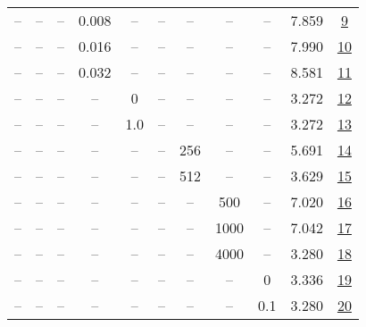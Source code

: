 \begin{table}[H]
\begin{tabular}{ccccccccccc}
-- & -- & -- & 0.008 & -- & -- & -- & -- & -- & 7.859 & \href{https://wandb.ai/stanford-mercury/optimizer-scaling/runs/sweep-300m-6B-minim70e785lr0.008-wd0.2-minlr0-warmup2000-b10.9-b-8588ff}{9} \\
-- & -- & -- & 0.016 & -- & -- & -- & -- & -- & 7.990 & \href{https://wandb.ai/stanford-mercury/optimizer-scaling/runs/sweep-300m-6B-mini7b7df9lr0.016-wd0.2-minlr0-warmup2000-b10.9-b2-7d82fa}{10} \\
-- & -- & -- & 0.032 & -- & -- & -- & -- & -- & 8.581 & \href{https://wandb.ai/stanford-mercury/optimizer-scaling/runs/sweep-300m-6B-mini1247b4lr0.032-wd0.2-minlr0-warmup2000-b10.9-b2-b5154c}{11} \\
-- & -- & -- & -- & 0 & -- & -- & -- & -- & 3.272 & \href{https://wandb.ai/stanford-mercury/optimizer-scaling/runs/sweep-300m-6B-minimf375ddlr0.004-wd0.2-minlr0-warmup2000-b10.9-b-eeb31b}{12} \\
-- & -- & -- & -- & 1.0 & -- & -- & -- & -- & 3.272 & \href{https://wandb.ai/stanford-mercury/optimizer-scaling/runs/sweep-300m-6B-mini0658b0lr0.004-wd0.2-minlr0-warmup2000-b10.9-b2-47b3ae}{13} \\
-- & -- & -- & -- & -- & -- & 256 & -- & -- & 5.691 & \href{https://wandb.ai/stanford-mercury/optimizer-scaling/runs/sweep-300m-6B-minim043b8elr0.004-wd0.2-minlr0-warmup2000-b10.9-b-687e85}{14} \\
-- & -- & -- & -- & -- & -- & 512 & -- & -- & 3.629 & \href{https://wandb.ai/stanford-mercury/optimizer-scaling/runs/sweep-300m-6B-minim140e6dlr0.004-wd0.2-minlr0-warmup2000-b10.9-b-2bda97}{15} \\
-- & -- & -- & -- & -- & -- & -- & 500 & -- & 7.020 & \href{https://wandb.ai/stanford-mercury/optimizer-scaling/runs/sweep-300m-6B-minim159817lr0.004-wd0.2-minlr0-warmup500-b10.9-b2-8ca381}{16} \\
-- & -- & -- & -- & -- & -- & -- & 1000 & -- & 7.042 & \href{https://wandb.ai/stanford-mercury/optimizer-scaling/runs/sweep-300m-6B-mini1778f2lr0.004-wd0.2-minlr0-warmup1000-b10.9-b2-55a012}{17} \\
-- & -- & -- & -- & -- & -- & -- & 4000 & -- & 3.280 & \href{https://wandb.ai/stanford-mercury/optimizer-scaling/runs/sweep-300m-6B-minim6fb244lr0.004-wd0.2-minlr0-warmup4000-b10.9-b-4c5f20}{18} \\
-- & -- & -- & -- & -- & -- & -- & -- & 0 & 3.336 & \href{https://wandb.ai/stanford-mercury/optimizer-scaling/runs/sweep-300m-6B-mini59d801lr0.004-wd0-minlr0-warmup2000-b10.9-b20.-559ac1}{19} \\
-- & -- & -- & -- & -- & -- & -- & -- & 0.1 & 3.280 & \href{https://wandb.ai/stanford-mercury/optimizer-scaling/runs/sweep-300m-6B-minimc4311dlr0.004-wd0.1-minlr0-warmup2000-b10.9-b-d451be}{20} \\
\bottomrule
\end{tabular}
\end{table}

